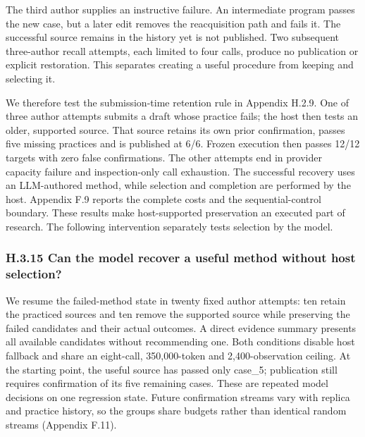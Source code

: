 \documentclass[11pt,a4paper]{article}
\begin{document}
The third author supplies an instructive failure. An intermediate program passes
the new case, but a later edit removes the reacquisition path and fails it. The
successful source remains in the history yet is not published. Two subsequent
three-author recall attempts, each limited to four calls, produce no publication
or explicit restoration. This separates creating a useful procedure from keeping
and selecting it.


We therefore test the submission-time retention rule in Appendix H.2.9. One of
three author attempts submits a draft whose practice fails; the host then tests
an older, supported source. That source retains its own prior confirmation,
passes five missing practices and is published at 6/6. Frozen execution then
passes 12/12 targets with zero false confirmations. The other attempts end in
provider capacity failure and inspection-only call exhaustion. The successful
recovery uses an LLM-authored method, while selection and completion are performed
by the host. Appendix F.9 reports the complete costs and the sequential-control
boundary. These results make host-supported preservation an executed part of research.
The following intervention separately tests selection by the model.


\subsubsection*{H.3.15 Can the model recover a useful method without host selection?}

We resume the failed-method state in twenty fixed author attempts: ten retain
the practiced sources and ten remove the supported source while preserving the
failed candidates and their actual outcomes. A direct evidence summary presents
all available candidates without recommending one. Both conditions disable host
fallback and share an eight-call, 350,000-token and 2,400-observation ceiling.
At the starting point, the useful source has passed only case\_5; publication
still requires confirmation of its five remaining cases. These are repeated
model decisions on one regression state. Future confirmation streams vary with
replica and practice history, so the groups share budgets rather than identical
random streams (Appendix F.11).
\end{document}
